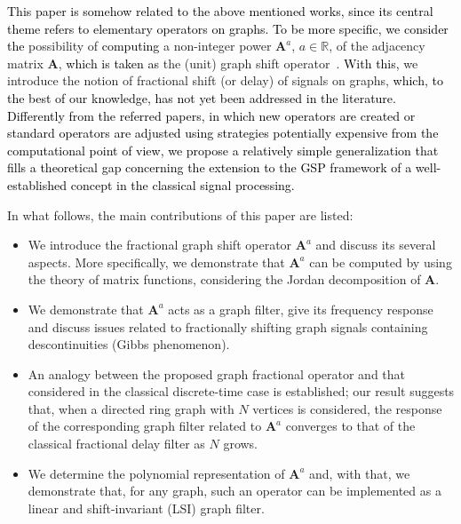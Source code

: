 \textcolor{black}{This paper is somehow related to the above mentioned works, since its central theme refers to elementary operators on graphs. To be more specific, we consider the} possibility of \textcolor{black}{computing} a non-integer power $\mathbf{A}^a$, $a\in\mathbb{R}$, of the adjacency matrix $\mathbf{A}$, \textcolor{black}{which is taken as} the (unit) graph shift operator~\cite{sandryhaila2014big}. \textcolor{black}{With this,} we introduce the notion of fractional shift (or delay) of signals on graphs, \textcolor{black}{which, to the best of our knowledge, has not yet been addressed in the literature. Differently from the referred papers, in which new operators are created or standard operators are adjusted using strategies potentially expensive from the computational point of view, we propose a relatively simple generalization that fills a theoretical gap concerning the extension to the GSP framework of a well-established concept in the classical signal processing.}

\color{black}
In what follows, the main contributions of this paper are listed:
\begin{itemize}
\item We introduce the fractional graph shift operator $\mathbf{A}^a$ and discuss its several aspects. More specifically, we demonstrate that $\mathbf{A}^a$ can be computed by using the theory of matrix functions, considering the Jordan decomposition of $\mathbf{A}$.
\item We demonstrate that $\mathbf{A}^a$ acts as a graph filter, give its frequency response and discuss issues related to fractionally shifting graph signals containing descontinuities (Gibbs phenomenon).

\item An analogy between the proposed graph fractional operator and that considered in the classical discrete-time case is established; our result suggests that, when a directed ring graph with $N$ vertices is considered, the response of the corresponding graph filter related to $\mathbf{A}^a$ converges to that of the classical fractional delay filter as $N$ grows.

\item We determine the polynomial representation of $\mathbf{A}^a$ and, with that, we demonstrate that, for any graph, such an operator can be implemented as a linear and shift-invariant (LSI) graph filter.
\end{itemize}

